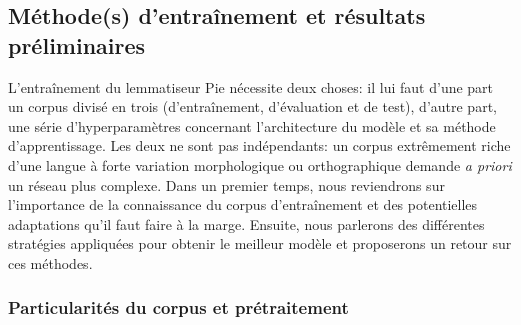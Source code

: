 \subsection{Méthode(s) d'entraînement et résultats préliminaires}

L'entraînement du lemmatiseur Pie nécessite deux choses: il lui faut d'une part un corpus divisé en trois (d'entraînement, d'évaluation et de test), d'autre part, une série d'hyperparamètres concernant l'architecture du modèle et sa méthode d'apprentissage. Les deux ne sont pas indépendants: un corpus extrêmement riche d'une langue à forte variation morphologique ou orthographique demande \textit{a priori} un réseau plus complexe. Dans un premier temps, nous reviendrons sur l'importance de la connaissance du corpus d'entraînement et des potentielles adaptations qu'il faut faire à la marge. Ensuite, nous parlerons des différentes stratégies appliquées pour obtenir le meilleur modèle et proposerons un retour sur ces méthodes.

\subsubsection{Particularités du corpus et prétraitement}

